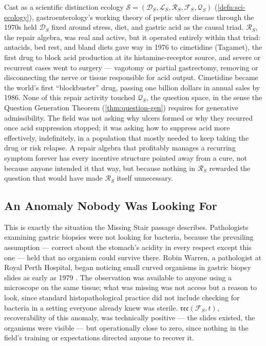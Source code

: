 \documentclass[12pt,twoside,openright]{book}
\newcommand{\reco}{\mathfrak{rec}}
\begin{document}
Cast as a scientific distinction ecology $\mathcal{S} =
(\mathcal{D}_S, \mathcal{L}_S, \mathcal{R}_S, \mathcal{F}_S,
\mathcal{Q}_S)$ (\cref{defn:sci-ecology}), gastroenterology's
working theory of peptic ulcer disease through the 1970s held
$\mathcal{D}_S$ fixed around stress, diet, and gastric acid as
the causal triad. $\mathcal{R}_S$, the repair algebra, was real
and active, but it operated entirely within that triad:
antacids, bed rest, and bland diets gave way in 1976 to
cimetidine (Tagamet), the first drug to block acid production at
its histamine-receptor source, and severe or recurrent cases
went to surgery --- vagotomy or partial gastrectomy, removing or
disconnecting the nerve or tissue responsible for acid output.
Cimetidine became the world's first ``blockbuster'' drug,
passing one billion dollars in annual sales by 1986. None of
this repair activity touched $\mathcal{Q}_S$, the question space,
in the sense the Question Generation Theorem
(\cref{thm:question-gen}) requires for generative admissibility.
The field was not asking why ulcers formed or why they recurred
once acid suppression stopped; it was asking how to suppress acid
more effectively, indefinitely, in a population that mostly
needed to keep taking the drug or risk relapse. A repair algebra
that profitably manages a recurring symptom forever has every
incentive structure pointed away from a cure, not because anyone
intended it that way, but because nothing in $\mathcal{R}_S$
rewarded the question that would have made $\mathcal{R}_S$ itself
unnecessary.

\subsection{An Anomaly Nobody Was Looking For}

This is exactly the situation the Missing Stair passage
describes. Pathologists examining gastric biopsies were not
looking for bacteria, because the prevailing assumption --- correct
about the stomach's acidity in every respect except this one ---
held that no organism could survive there. Robin Warren, a
pathologist at Royal Perth Hospital, began noticing small curved
organisms in gastric biopsy slides as early as 1979
\parencite{kyle2016}. The
observation was available to anyone using a microscope on the
same tissue; what was missing was not access but a reason to look,
since standard histopathological practice did not include
checking for bacteria in a setting everyone already knew was
sterile. $\reco(\mathcal{F}_S, t)$, recoverability of this
anomaly, was technically positive --- the slides existed, the
organisms were visible --- but operationally close to zero, since
nothing in the field's training or expectations directed anyone
to recover it.
\end{document}

